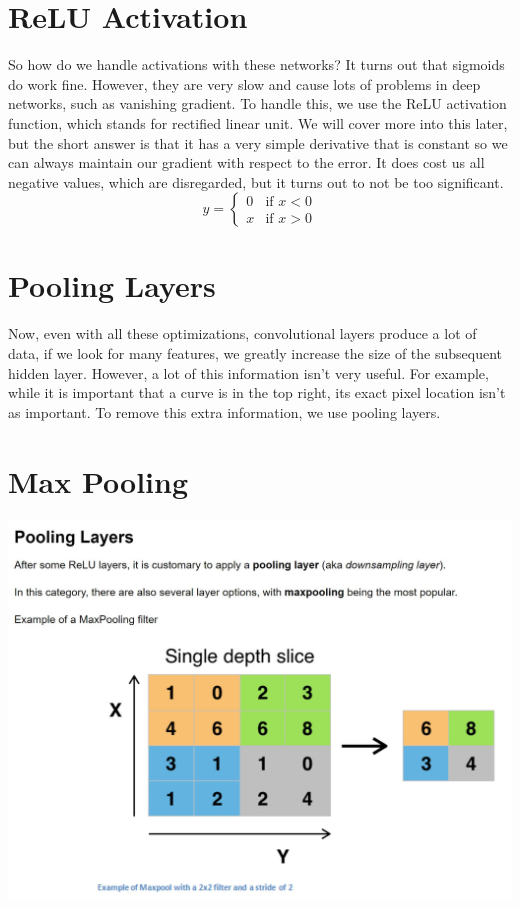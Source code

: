 \documentclass{article}
\begin{document}
\section{ReLU Activation}
So how do we handle activations with these networks? It turns out that sigmoids do work fine. However, they are very slow and cause lots of problems in deep networks, such as vanishing gradient. To handle this, we use the ReLU activation function, which stands for rectified linear unit. We will cover more into this later, but the short answer is that it has a very simple derivative that is constant so we can always maintain our gradient with respect to the error. It does cost us all negative values, which are disregarded, but it turns out to not be too significant.
\[
  y =
  \begin{cases}
                                   0 & \text{if $x < 0$} \\
  x & \text{if $x > 0$}
  \end{cases}
\]

\section{Pooling Layers}
Now, even with all these optimizations, convolutional layers produce a lot of data, if we look for many features, we greatly increase the size of the subsequent hidden layer. However, a lot of this information isn't very useful. For example, while it is important that a curve is in the top right, its exact pixel location isn't as important. To remove this extra information, we use pooling layers.

\section{Max Pooling}
\begin{center}
\includegraphics[scale=0.5]{pooling}
\end{center}
\end{document}
